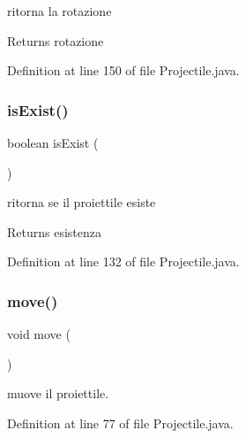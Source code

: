 ritorna la rotazione 

\begin{DoxyReturn}{Returns}
rotazione 
\end{DoxyReturn}


Definition at line 150 of file Projectile.\+java.

\mbox{\label{classobjects_1_1_projectile_a7c498cab7528e704f34b7373e817e066}} 
\subsubsection{\texorpdfstring{is\+Exist()}{isExist()}}
{\footnotesize\ttfamily boolean is\+Exist (\begin{DoxyParamCaption}{ }\end{DoxyParamCaption})}



ritorna se il proiettile esiste 

\begin{DoxyReturn}{Returns}
esistenza 
\end{DoxyReturn}


Definition at line 132 of file Projectile.\+java.

\mbox{\label{classobjects_1_1_projectile_a68c0b61b84e4e095b6463cadc275adae}} 
\subsubsection{\texorpdfstring{move()}{move()}}
{\footnotesize\ttfamily void move (\begin{DoxyParamCaption}{ }\end{DoxyParamCaption})}



muove il proiettile. 



Definition at line 77 of file Projectile.\+java.

\mbox{\label{classobjects_1_1_projectile_afa3243732c07b4447e665ddede58e3d0}} 
